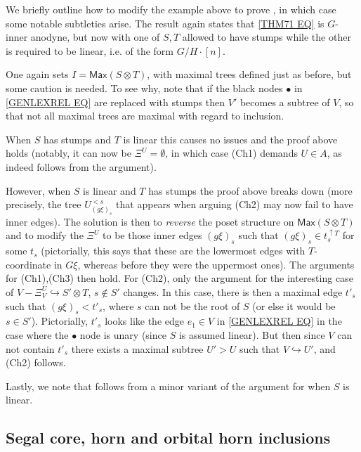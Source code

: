 \documentclass[a4paper,10pt
,draft
]{article}%
\begin{document}
 
\begin{remark}
We briefly outline how to modify the example above to prove 
\cite[Thm 7.1(ii)]{Per18}, in which case some notable subtleties arise.
The result again states that \eqref{THM71 EQ} is $G$-inner anodyne, but now with one of $S,T$ allowed to have stumps while the other is required to be linear, i.e. of the form $G/H \cdot [n]$.

One again sets $I=\mathsf{Max}(S\otimes T)$, with maximal trees defined just as before, but some caution is needed.
To see why, note that if the black nodes $\bullet$ in \eqref{GENLEXREL EQ} are replaced with stumps then $V'$
becomes a subtree of $V$, so that not all maximal trees are maximal with regard to inclusion.

When $S$ has stumps and $T$ is linear this causes no issues and the proof above holds
(notably, it can now be 
$\Xi^U = \emptyset$, in which case (Ch1) demands $U \in A$,
as indeed follows from the argument).

However, when $S$ is linear and $T$ has stumps the proof above breaks down (more precisely, the tree $U_{(g\xi)_s}^{<s}$ that appears when arguing (Ch2) may now fail to have inner edges). The solution is then to \textit{reverse} the poset structure on 
$\mathsf{Max}(S\otimes T)$
and to modify the $\Xi^U$ to be those inner edges $(g \xi)_s$ such that
$(g \xi)_s \in t_s^{\uparrow T}$ for some $t_s$
(pictorially, this says that these are the lowermost edges with $T$-coordinate in $G\xi$, whereas before they were the uppermost ones). The arguments for (Ch1),(Ch3) then hold.
For (Ch2), only the argument for the interesting case of
$V- \Xi_V^U \hookrightarrow S' \otimes T$, $s \not \in S'$
changes. In this case, there is then a maximal edge $t'_s$ such that $(g \xi)_s < t'_s$, where $s$ can not be the root of $S$ (or else it would be $s \in S'$). Pictorially, $t'_s$ looks like the edge $e_1 \in V$ in \eqref{GENLEXREL EQ} in the case where the $\bullet$ node is unary (since $S$ is assumed linear). But then since $V$ can not contain $t'_s$ there exists a maximal subtree $U' > U$ such that $V \hookrightarrow U'$,
and (Ch2) follows.

Lastly, we note that \cite[Thm. 7.2]{Per18} follows from a minor variant of the argument for \cite[Thm. 7.1(ii)]{Per18} when $S$ is linear.
\end{remark}



\subsection{Segal core, horn and orbital horn inclusions}\label{HYPERSAT SEC}
\end{document}
